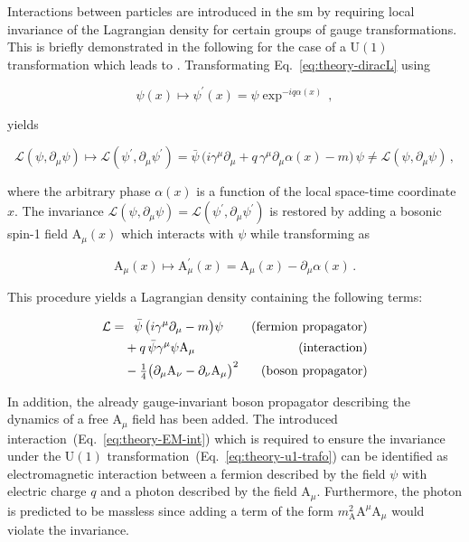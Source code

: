 Interactions between particles are introduced in the \gls{sm} by requiring local invariance of the Lagrangian density for certain groups of gauge transformations. This is briefly demonstrated in the following for the case of a $\mathrm{U(1)}$ transformation which leads to . Transformating Eq.~\ref{eq:theory-diracL} using 

\begin{equation}
\psi(x)\mapsto\psi^{\prime}(x)=\psi\exp^{-iq\alpha(x)}\,, \label{eq:theory-u1-trafo}
\end{equation}

yields

\begin{equation}
\mathcal{L}(\psi,\partial_\mu\psi)\mapsto\mathcal{L}(\psi^{\prime},\partial_\mu\psi^{\prime})=\bar{\psi}\,\Big(i\gamma^\mu\partial_\mu+q\,\gamma^\mu\partial_\mu\alpha(x)-m\Big)\,\psi\not=\mathcal{L}(\psi,\partial_\mu\psi)\,,
\end{equation}

where the arbitrary phase $\alpha(x)$ is a function of the local space-time coordinate $x$. The invariance $\mathcal{L}(\psi,\partial_\mu\psi)=\mathcal{L}(\psi^{\prime},\partial_\mu\psi^{\prime})$ is restored by adding a bosonic spin-1 field $\mathrm{A}_{\mu}(x)$ which interacts with $\psi$ while transforming as

\begin{equation}
\mathrm{A}_{\mu}(x)\mapsto \mathrm{A}^{\prime}_{\mu}(x)=\mathrm{A}_\mu(x)-\partial_\mu\alpha(x)\,.
\end{equation}

This procedure yields a Lagrangian density containing the following terms:

\begin{subequations}
\begin{align}
\mathcal{L}=&\hphantom{+}\bar{\psi}\,\big(i\gamma^\mu\partial_\mu-m\big)\psi &(\mathrm{fermion~propagator}) \\
            &+q\,\bar{\psi}\gamma^{\mu}\psi \mathrm{A}_{\mu} &(\mathrm{interaction}) \label{eq:theory-EM-int}\\
            &-\tfrac{1}{4}\big(\partial_\mu \mathrm{A}_\nu-\partial_\nu \mathrm{A}_\mu\big)^{2} &(\mathrm{boson~propagator})
\end{align}
\end{subequations}

In addition, the already gauge-invariant boson propagator describing the dynamics of a free $\mathrm{A}_\mu$ field has been added. The introduced interaction~(Eq.~\ref{eq:theory-EM-int}) which is required to ensure the invariance under the $\mathrm{U(1)}$ transformation~(Eq.~\ref{eq:theory-u1-trafo}) can be identified as electromagnetic interaction between a fermion described by the field $\psi$ with electric charge $q$ and a photon described by the field $\mathrm{A}_\mu$. Furthermore, the photon is predicted to be massless since adding a term of the form $m^{2}_\mathrm{A}\mathrm{A}^\mu \mathrm{A}_\mu$ would violate the invariance.

